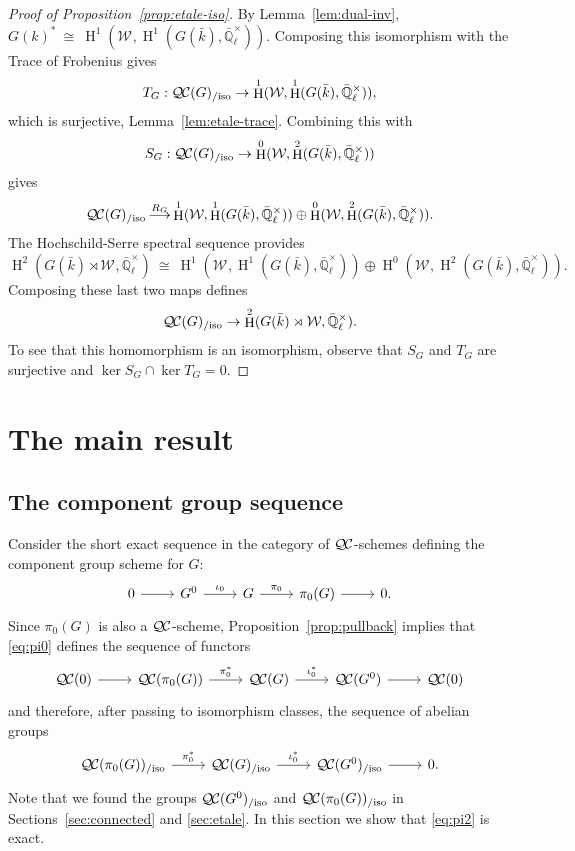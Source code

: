 \documentclass{amsart}
\theoremstyle{plain}
\theoremstyle{definition}
\theoremstyle{remark}
\newcommand{\EE}{\mathbb{\bar Q}_\ell}
\newcommand{\bFq}{\bar{k}}
\newcommand{\Fq}{k}
\newcommand{\EEx}{\EE^\times}
\newcommand{\Weil}[1]{\mathcal{W}_{#1}}
\DeclareMathOperator{\Hh}{H}
\newcommand{\iso}{{\ \cong\ }}
\newcommand{\QC}{{\mathcal{Q\hskip-0.8pt C}}}
\newcommand{\QCiso}[1]{\QC(#1)_{/\text{iso}}}
\begin{document}
\begin{proof}[Proof of Proposition~\ref{prop:etale-iso}]
By Lemma~\ref{lem:dual-inv}, $G(\Fq)^* \iso \Hh^1(\Weil{},\Hh^1(G(\bFq),\EEx))$. Composing this isomorphism with the Trace of Frobenius gives
\[
T_{G}: \QCiso{G}\to  \Hh^1(\Weil{},\Hh^1(G(\bFq),\EEx)),
\]
which is surjective, Lemma~\ref{lem:etale-trace}.
Combining this with
\[
S_{G} : \QCiso{G} \to \Hh^0(\Weil{}, \Hh^2(G(\bFq),\EEx))
\]
gives
\[
\QCiso{G} \mathop{\longrightarrow}\limits^{R_G} \Hh^1(\Weil{},\Hh^1(G(\bFq),\EEx))\oplus \Hh^0(\Weil{}, \Hh^2(G(\bFq),\EEx)).
\]
The Hochschild-Serre spectral sequence provides
\[
\Hh^2(G(\bFq)\rtimes \Weil{},\EEx)  \iso \Hh^1(\Weil{}, \Hh^1(G(\bFq),\EEx)) \oplus \Hh^0(\Weil{}, \Hh^2(G(\bFq),\EEx)).
\]
Composing these last two maps defines
\begin{equation}
\QCiso{G}\to \Hh^2(G(\bFq)\rtimes \Weil{},\EEx).
\end{equation}
To see that this homomorphism is an isomorphism, observe that $S_G$ and $T_G$ are surjective and $\ker S_G \cap \ker T_G = 0$.
\end{proof}

\section{The main result}

\subsection{The component group sequence} \label{sec:restriction}

Consider the short exact sequence in the category of $\QC$-schemes
defining the component group scheme for $G$:
\begin{equation}\label{eq:pi0}
\begin{tikzcd}
0 \rar & G^0 \arrow{r}{\iota_0} & G \arrow{r}{\pi_0} & \pi_0(G) \rar & 0.
\end{tikzcd}
\end{equation}
Since $\pi_0(G)$ is also a $\QC$-scheme,
Proposition~\ref{prop:pullback} implies that \eqref{eq:pi0} defines the sequence of functors
\begin{equation}\label{eq:pi1}
\begin{tikzcd}
\QC(0) \rar & \QC(\pi_0(G)) \arrow{r}{\pi_0^*} & \QC(G) \arrow{r}{\iota_0^*} & \QC(G^0) \rar & \QC(0)
\end{tikzcd}
\end{equation}
and therefore, after passing to isomorphism classes, the sequence of abelian groups
\begin{equation}\label{eq:pi2}
\begin{tikzcd}
\QCiso{\pi_0(G)} \arrow{r}{\pi_0^*} & \QCiso{G} \arrow{r}{\iota_0^*} & \QCiso{G^0} \rar & 0.
\end{tikzcd}
\end{equation}
 Note that we found the groups $\QCiso{G^0}$
and $\QCiso{\pi_0(G)}$
in Sections~\ref{sec:connected} and \ref{sec:etale}.
In this section we show that \eqref{eq:pi2} is exact.
\end{document}
